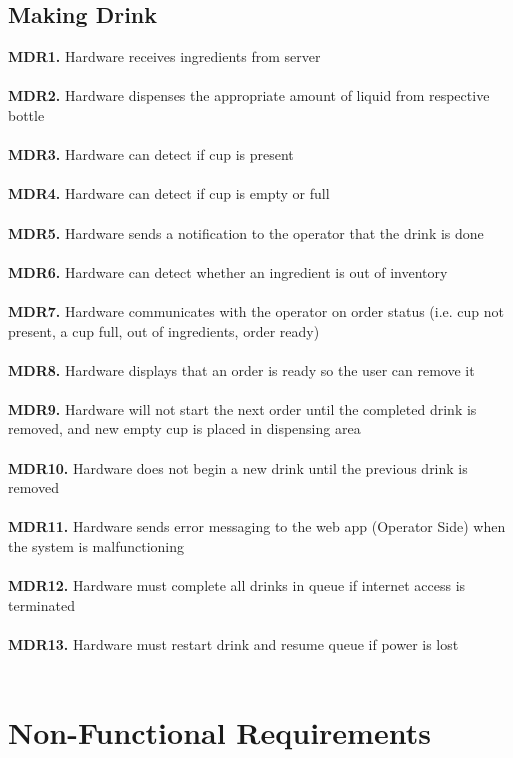 \documentclass{article}
\begin{document}
\subsection{Making Drink}
    \noindent\textbf{MDR1.} Hardware receives ingredients from server \\\\
    \textbf{MDR2.} Hardware dispenses the appropriate amount of liquid from respective bottle \\\\
    \textbf{MDR3.} Hardware can detect if cup is present \\\\
    \textbf{MDR4.} Hardware can detect if cup is empty or full \\\\
    \textbf{MDR5.} Hardware sends a notification to the operator that the drink is done \\\\
    \textbf{MDR6.} Hardware can detect whether an ingredient is out of inventory \\\\
    \textbf{MDR7.} Hardware communicates with the operator on order status (i.e. cup not present, a cup full, out of ingredients, order ready) \\\\
    \textbf{MDR8.} Hardware displays that an order is ready so the user can remove it \\\\
    \textbf{MDR9.} Hardware will not start the next order until the completed drink is removed, and new empty cup is placed in dispensing area \\\\
    \textbf{MDR10.} Hardware does not begin a new drink until the previous drink is removed \\\\
    \textbf{MDR11.} Hardware sends error messaging to the web app (Operator Side) when the system is malfunctioning\\\\
    \textbf{MDR12.} Hardware must complete all drinks in queue if internet access is terminated \\\\
    \textbf{MDR13.} Hardware must restart drink and resume queue if power is lost \\\\


\section{Non-Functional Requirements}
\end{document}
